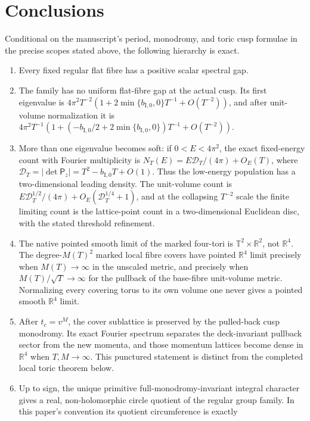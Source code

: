 \documentclass[11pt]{article}
\numberwithin{equation}{section}
\theoremstyle{definition}
\theoremstyle{remark}
\newcommand{\R}{\mathbb R}
\newcommand{\T}{\mathbb T}
\begin{document}
\section{Conclusions}

Conditional on the manuscript's period, monodromy, and toric cusp formulae
in the precise scopes stated above, the following hierarchy is exact.

\begin{enumerate}[leftmargin=2.3em]
\item Every fixed regular flat fibre has a positive scalar spectral gap.
\item The family has no uniform flat-fibre gap at the actual cusp.  Its first
eigenvalue is
$4\pi^2T^{-2}(1+2\min\{b_{\mathrm I,0},0\}T^{-1}+O(T^{-2}))$, and after unit-volume
normalization it is
$4\pi^2T^{-1}(1+(-b_{\mathrm I,0}/2+2\min\{b_{\mathrm I,0},0\})T^{-1}+O(T^{-2}))$.
\item More than one eigenvalue becomes soft: if $0<E<4\pi^2$, the exact
fixed-energy count with Fourier multiplicity is
$N_T(E)=E\mathcal D_T/(4\pi)+O_E(T)$, where
$\mathcal D_T=|\det\mathsf P_z|=T^2-b_{\mathrm I,0}T+O(1)$.  Thus the low-energy
population has a two-dimensional leading density.  The unit-volume count is
$E\mathcal D_T^{1/2}/(4\pi)+O_E(\mathcal D_T^{1/4}+1)$, and at the
collapsing $T^{-2}$ scale the finite limiting count is the lattice-point count
in a two-dimensional Euclidean disc, with the stated threshold refinement.
\item The native pointed smooth limit of the marked four-tori is
$\T^2\times\R^2$, not $\R^4$.  The degree-$M(T)^2$ marked local fibre covers
have pointed $\R^4$ limit precisely when $M(T)\to\infty$ in the unscaled
metric, and precisely when $M(T)/\sqrt T\to\infty$ for the pullback of the
base-fibre unit-volume metric.  Normalizing every covering torus to its own
volume one never gives a pointed smooth $\R^4$ limit.
\item After $t_c=v^M$, the cover sublattice is preserved by the pulled-back
cusp monodromy.  Its exact Fourier spectrum separates the deck-invariant
pullback sector from the new momenta, and those momentum lattices become dense
in $\R^4$ when $T,M\to\infty$.  This punctured statement is distinct from
the completed local toric theorem below.
\item Up to sign, the unique primitive full-monodromy-invariant integral
character gives a real, non-holomorphic circle quotient of the regular group
family.  In this paper's convention its quotient circumference is exactly

\end{enumerate}
\end{document}
